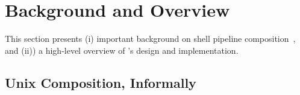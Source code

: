 \documentclass[sigplan,10pt,review,anonymous]{acmart}
\begin{document}
% 

\section{Background and Overview}
\label{bg}

This section presents (i) important background on shell pipeline composition~, and (ii)) a high-level overview of \sys's design and implementation.

\subsection{Unix Composition, Informally}
\label{bg:pipelines}
\end{document}
